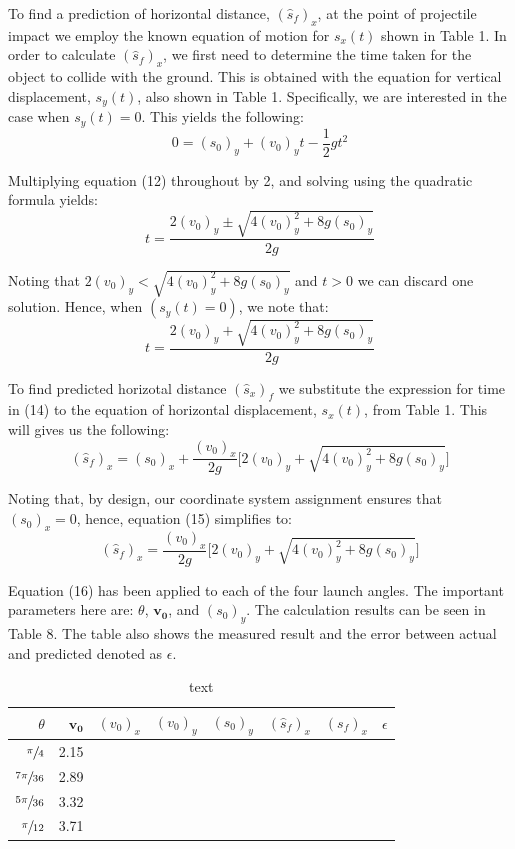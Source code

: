 \documentclass[a4paper]{article}
\begin{document}
To find a prediction of horizontal distance, $(\hat{s}_f)_x$, at the point of projectile impact we employ the known equation of motion for $s_x(t)$ shown in Table 1. In order to calculate $(\hat{s}_f)_x$, we first need to determine the time taken for the object to collide with the ground. This is obtained with the equation for vertical displacement, $s_y(t)$, also shown in Table 1. Specifically, we are interested in the case when $s_y(t) = 0$. This yields the following:
\begin{equation}
0 = (s_0)_y + (v_0)_y t - \frac{1}{2}gt^2
\end{equation}

Multiplying equation (12) throughout by 2, and solving using the quadratic formula yields:
\begin{equation}
t = \frac{2(v_0)_y \pm \sqrt{4(v_0)_y^2 + 8g(s_0)_y}}{2g}
\end{equation} 

Noting that $2(v_0)_y < \sqrt{4(v_0)_y^2 + 8g(s_0)_y}$ and $t>0$ we can discard one solution. Hence, when $(s_y(t) = 0)$, we note that:
\begin{equation}
t = \frac{2(v_0)_y + \sqrt{4(v_0)_y^2 + 8g(s_0)_y}}{2g}
\end{equation}

To find predicted horizotal distance ${(\hat{s}_x)_f}$ we substitute the expression for time in (14) to the equation of horizontal displacement, $s_x(t)$, from Table 1. This will gives us the following:
\begin{equation}
(\hat{s}_f)_x = (s_0)_x + \frac{(v_0)_x}{2g} \bigg[2(v_0)_y + \sqrt{4(v_0)_y^2 + 8g(s_0)_y}\bigg]
\end{equation}

Noting that, by design, our coordinate system assignment ensures that $(s_0)_x = 0$, hence, equation (15) simplifies to:
\begin{equation}
(\hat{s}_f)_x = \frac{(v_0)_x}{2g} \bigg[2(v_0)_y + \sqrt{4(v_0)_y^2 + 8g(s_0)_y}\bigg]
\end{equation}

Equation (16) has been applied to each of the four launch angles. The important parameters here are: $\theta$, $\boldsymbol{v_0}$, and $(s_0)_y$. The calculation results can be seen in Table 8. The table also shows the measured result and the error between actual and predicted denoted as $\epsilon$.
\begin{table}[h]
	\centering
	\caption{text}
	\begin{tabular}{rrrrrrrr}
		\toprule
		$\theta$ & $\boldsymbol{v_0}$ & $(v_0)_x$ & $(v_0)_y$ & $(s_0)_y$ & $(\hat{s}_f)_x$ & $(s_f)_x$ & $\epsilon$\\
		\midrule
		$\sfrac{\pi}{4}$ & 2.15 & & & & & & \\
		$\sfrac{7\pi}{36}$ & 2.89 & & & & & & \\
		$\sfrac{5\pi}{36}$ & 3.32 & & & & & & \\
		$\sfrac{\pi}{12}$ & 3.71 & & & & & & \\
		\bottomrule
	\end{tabular}
\end{table}
\end{document}

